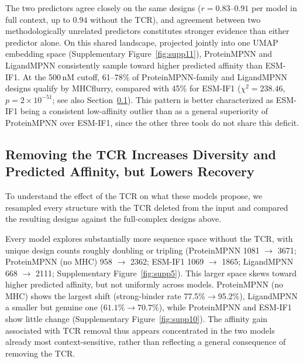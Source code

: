 \documentclass[letterpaper]{article}
\begin{document}
The two predictors agree closely on the same designs ($r=0.83$--$0.91$ per model in full context, up to
$0.94$ without the TCR), and agreement between two methodologically unrelated predictors constitutes
stronger evidence than either predictor alone. On this shared landscape, projected jointly into one UMAP
embedding space (Supplementary Figure~\ref{fig:supp11}), ProteinMPNN and LigandMPNN consistently sample
toward higher predicted affinity than ESM-IF1. At the 500\,nM cutoff, 61--78\% of ProteinMPNN-family and
LigandMPNN designs qualify by MHCflurry, compared with 45\% for ESM-IF1 ($\chi^2=238.46$,
$p=2\times10^{-51}$; see also Section~\ref{sec:tcr}). This pattern is better characterized as ESM-IF1 being a
consistent low-affinity outlier than as a general superiority of ProteinMPNN over ESM-IF1, since the
other three tools do not share this deficit.

\subsection{Removing the TCR Increases Diversity and Predicted Affinity, but Lowers Recovery}
\label{sec:tcr}

To understand the effect of the TCR on what these models propose, we resampled every structure with the
TCR deleted from the input and compared the resulting designs against the full-complex designs above.

Every model explores substantially more sequence space without the TCR, with unique design counts roughly
doubling or tripling (ProteinMPNN 1081 $\to$ 3671; ProteinMPNN (no MHC) 958 $\to$ 2362; ESM-IF1 1069 $\to$
1865; LigandMPNN 668 $\to$ 2111; Supplementary Figure~\ref{fig:supp5}). This larger space skews toward
higher predicted affinity, but not uniformly across models. ProteinMPNN (no MHC) shows the largest shift
(strong-binder rate 77.5\%$\to$95.2\%), LigandMPNN a smaller but genuine one ($61.1\%\to70.7\%$), while
ProteinMPNN and ESM-IF1 show little change (Supplementary Figure~\ref{fig:supp10}). The affinity gain
associated with TCR removal thus appears concentrated in the two models already most context-sensitive,
rather than reflecting a general consequence of removing the TCR.
\end{document}
